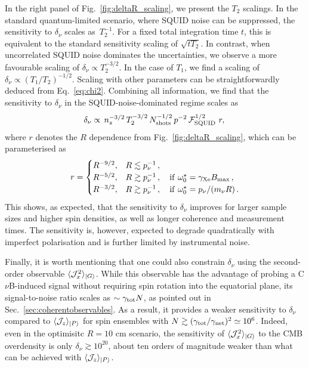 \documentclass[aps,prd,10pt,twocolumn,superscriptaddress,floatfix,nofootinbib,amsmath,amssymb,altaffilletter,preprintnumbers]{revtex4-1}
\begin{document}
In the right panel of Fig.~\ref{fig:deltaR_scaling}, we present the $T_2$ scalings. In the standard quantum-limited scenario, where SQUID noise can be suppressed, the sensitivity to $\delta_\nu$ scales as~$T_2^{-1}$. For a fixed total integration time $t$, this is equivalent to the standard sensitivity scaling of $\sqrt{t T_2}$. In contrast, when uncorrelated SQUID noise dominates the uncertainties, we observe a more favourable scaling of $\delta_\nu \propto T_2^{-3/2}$.  In the case of $T_1$, we find a scaling of $\delta_\nu \propto (T_1/T_2)^{-1/2}$.
Scaling with other parameters can be straightforwardly deduced from Eq.~\eqref{eq:chi2}.  Combining all information, we find that the sensitivity to $\delta_\nu$ in the SQUID-noise-dominated regime scales as 
\begin{equation}
\delta_\nu \propto \, n_s^{-3/2} \, T_2^{-3/2}  \, N^{-1/2}_{\rm shots}\, p^{-2} \,  {\cal F}_{\rm SQUID}^{1/2} ~r, \,
\end{equation} 
where $r$ denotes the $R$ dependence from Fig.~\ref{fig:deltaR_scaling}, which can be parameterised as 
\begin{equation}
    r = \begin{cases}
    R^{-9/2}, & R\lesssim p^{-1}_\nu\, ,\\
    R^{-5/2}, & R\gtrsim p^{-1}_\nu\, , ~~~{\rm if}~\omega^\star_0=\gamma_{\rm Xe}B_{\rm max}\, , \\
    R^{-3/2}, & R\gtrsim p^{-1}_\nu\, , ~~~{\rm if}~\omega^\star_0=p_{\nu}/(m_{\nu} R)\, .
\end{cases}
\end{equation} 
This shows, as expected, that the sensitivity to $\delta_\nu$ improves for larger sample sizes and higher spin densities, as well as longer coherence and measurement times. The sensitivity is, however, expected to degrade quadratically with imperfect polarisation and is further limited by instrumental noise. 

Finally, it is worth mentioning that one could also constrain $\delta_{\nu}$ using the second-order observable $\langle {\cal J}_x^2 \rangle_{\vert G\rangle}$. While this observable has the advantage of probing a C$\nu$B-induced signal without requiring spin rotation into the equatorial plane, its signal-to-noise ratio scales as $\sim \gamma_{\rm tot} N$, as pointed out in Sec.~\ref{sec:coherentobservables}. As a result, it provides a weaker sensitivity to $\delta_\nu$ compared to $\langle {\cal J}_z \rangle_{|P\rangle}$ for spin ensembles with $N \gtrsim (\gamma_{\rm tot}/\gamma_{\rm net})^2 \simeq 10^6$. Indeed, even in the optimisitc $R=10$ cm scenario, the sensitivity of $\langle {\cal J}_x^2 \rangle_{\vert G\rangle}$ to the CMB overdensity is only  $\delta_\nu\gtrsim 10^{20}$, about ten orders of magnitude weaker than what can be achieved with $\langle {\cal J}_z \rangle_{\vert P\rangle}$.
\end{document}
